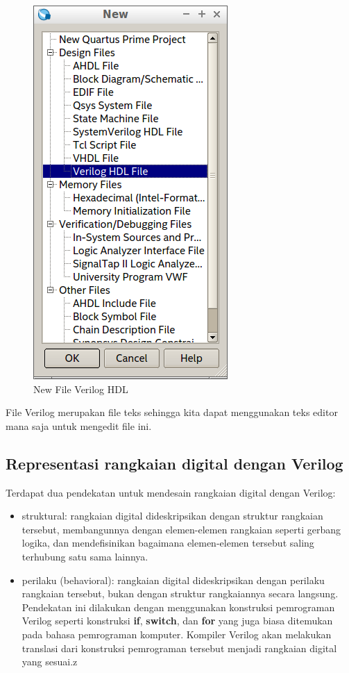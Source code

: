 \documentclass[a4paper,11pt,bahasa]{extarticle}
\begin{document}
\begin{figure}[H]
\centering
\includegraphics[scale=0.5]{images/new_file_verilog.png}
\par
\caption{New File Verilog HDL}
\end{figure}

File Verilog merupakan file teks sehingga kita dapat menggunakan
teks editor mana saja untuk mengedit file ini.


\subsection{Representasi rangkaian digital dengan Verilog}

Terdapat dua pendekatan untuk mendesain rangkaian digital dengan Verilog:
\begin{itemize}

\item struktural: rangkaian digital dideskripsikan dengan struktur
rangkaian tersebut, membangunnya
dengan elemen-elemen rangkaian seperti gerbang logika, dan mendefisinikan
bagaimana elemen-elemen tersebut saling terhubung satu sama lainnya.

\item perilaku (behavioral): rangkaian digital dideskripsikan dengan
perilaku rangkaian tersebut, bukan dengan struktur rangkaiannya secara
langsung. Pendekatan ini dilakukan dengan menggunakan konstruksi
pemrograman Verilog seperti konstruksi \textbf{if}, \textbf{switch}, dan
\textbf{for} yang juga biasa ditemukan pada bahasa
pemrograman komputer. Kompiler Verilog akan melakukan translasi
dari konstruksi pemrograman tersebut menjadi rangkaian digital yang sesuai.z

\end{itemize}
\end{document}
